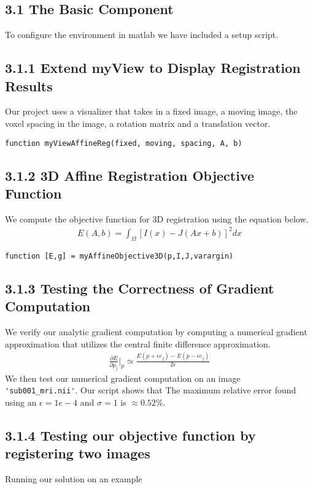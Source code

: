\documentclass{article}
\begin{document}
	\begin{par}
		\section*{3.1 The Basic Component}
		To configure the environment in matlab we have included a setup script.
		
		
		\subsection*{3.1.1 Extend myView to Display Registration Results}
			Our project uses a visualizer that takes in a fixed image, a moving image, the voxel spacing in the image, a rotation matrix and a translation vector. 
			\begin{lstlisting}
function myViewAffineReg(fixed, moving, spacing, A, b)
			\end{lstlisting}
			
			
		\subsection*{3.1.2 3D Affine Registration Objective Function}
			We compute the objective function for 3D registration using the equation below.
			\begin{align*}
				E(A,b) = \int_{\Omega} [ I(x) - J(Ax+b)]^{2} dx
			\end{align*}

			\begin{lstlisting}
function [E,g] = myAffineObjective3D(p,I,J,varargin)
			\end{lstlisting}
			
			

		\subsection*{3.1.3 Testing the Correctness of Gradient Computation}
			We verify our analytic gradient computation by computing a numerical gradient approximation that utilizes the central finite difference approximation. 
			\begin{align*}
				\frac{\partial E}{\partial p_{j}} |_{p} \simeq  \frac{E(p + \epsilon e_{j}) - E(p - \epsilon e_{j})}{2 \epsilon}
			\end{align*}
			We then test our numerical gradient computation on an image \lstinline|'sub001_mri.nii'|. Our script shows that The maximum relative error found using an $\epsilon = 1e-4$ and $\sigma = 1$ is  $\approx 0.52\%$.
			
			
			
		
		\subsection*{3.1.4 Testing our objective function by registering two images}
		
		
		
		Running our solution on an example 
	\end{par}
	
\end{document}
